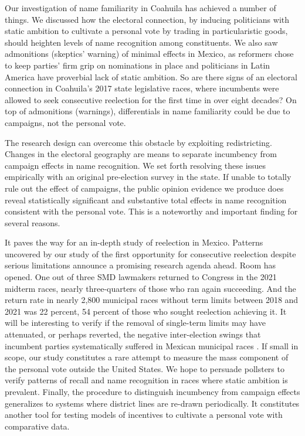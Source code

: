 \documentclass[letter,12pt]{article}
\begin{document}
Our investigation of name familiarity in Coahuila has achieved a number of things. We discussed how the electoral connection, by inducing politicians with static ambition to cultivate a personal vote by trading in particularistic goods, should heighten levels of name recognition among constituents. We also saw admonitions (skeptics' warning) of minimal effects in Mexico, as reformers chose to keep parties' firm grip on nominations in place and politicians in Latin America have proverbial lack of static ambition. So are there signs of an electoral connection in Coahuila's 2017 state legislative races, where incumbents were allowed to seek consecutive reelection for the first time in over eight decades? On top of admonitions (warnings), differentials in name familiarity could be due to campaigns, not the personal vote. 

The research design can overcome this obstacle by exploiting redistricting. Changes in the electoral geography are means to separate incumbency from campaign effects in name recognition. We set forth resolving these issues empirically with an original pre-election survey in the state. If unable to totally rule out the effect of campaigns, the public opinion evidence we produce does reveal statistically significant and substantive total effects in name recognition consistent with the personal vote. This is a noteworthy and important finding for several reasons. 

It paves the way for an in-depth study of reelection in Mexico. Patterns uncovered by our study of the first opportunity for consecutive reelection despite serious limitations announce a promising research agenda ahead. Room has opened. One out of three SMD lawmakers returned to Congress in the 2021 midterm races, nearly three-quarters of those who ran again succeeding. And the return rate in nearly 2,800 municipal races without term limits between 2018 and 2021 was 22 percent, 54 percent of those who sought reelection achieving it. It will be interesting to verify if the removal of single-term limits may have attenuated, or perhaps reverted, the negative inter-election swings that incumbent parties systematically suffered in Mexican municipal races \citep{lucardi.rosas.Incumbency.2016}. If small in scope, our study constitutes a rare attempt to measure the mass component of the personal vote outside the United States. We hope to persuade pollsters to verify patterns of recall and name recognition in races where static ambition is prevalent. Finally, the procedure to distinguish incumbency from campaign effects generalizes to systems where district lines are re-drawn periodically. It constitutes another tool for testing models of incentives to cultivate a personal vote with comparative data. 
\end{document}

